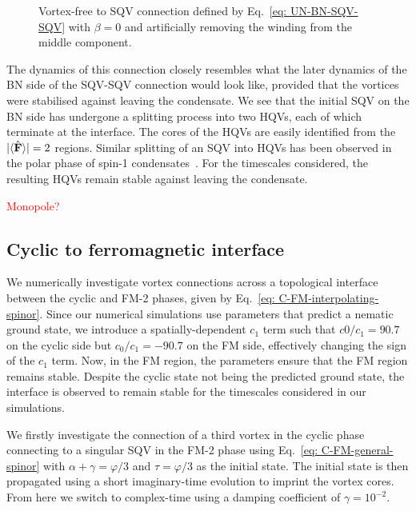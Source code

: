 \begin{figure}
\begin{subfigure}{0.45\textwidth}
        \caption{}
    \end{subfigure}
    \caption{\label{fig: UN-BN-VF-SQV} Vortex-free to SQV connection defined
        by Eq.~\eqref{eq: UN-BN-SQV-SQV} with \(\beta=0\) and artificially removing
        the winding from the middle component.}
\end{figure}
The dynamics of this connection closely resembles what the later dynamics of the
BN side of the SQV-SQV connection would look like, provided that the vortices
were stabilised against leaving the condensate.
We see that the initial SQV on the BN side has undergone a splitting process
into two HQVs, each of which terminate at the interface.
The cores of the HQVs are easily identified from the
\(|\langle \hat{\vb{F}} \rangle | = 2\) regions.
Similar splitting of an SQV into HQVs has been observed in the polar phase of
spin-1 condensates~\cite{Seo2015, Xiao2021}.
For the timescales considered, the resulting HQVs remain stable against
leaving the condensate.

\textcolor{red}{Monopole?}

\subsection{Cyclic to ferromagnetic interface}
We numerically investigate vortex connections across a topological interface
between the cyclic and FM-2 phases, given by
Eq.~\eqref{eq: C-FM-interpolating-spinor}.
Since our numerical simulations use parameters that predict a nematic ground
state, we introduce a spatially-dependent \(c_1\) term such that \(c0/c_1=90.7\)
on the cyclic side but \(c_0/c_1=-90.7\) on the FM side, effectively changing
the sign of the \(c_1\) term.
Now, in the FM region, the parameters ensure that the FM region remains stable.
Despite the cyclic state not being the predicted ground state, the interface
is observed to remain stable for the timescales considered in our simulations.

We firstly investigate the connection of a third vortex in the cyclic phase
connecting to a singular SQV in the FM-2 phase using
Eq.~\eqref{eq: C-FM-general-spinor} with \(\alpha + \gamma = \varphi/3\) and
\(\tau=\varphi/3\) as the initial state.
The initial state is then propagated using a short imaginary-time evolution to
imprint the vortex cores.
From here we switch to complex-time using a damping coefficient of
\(\gamma=10^{-2}\).

